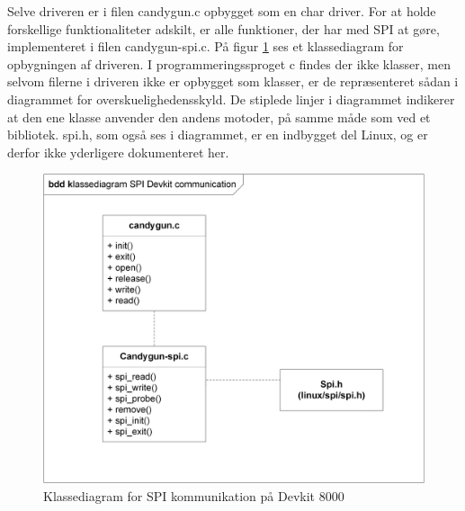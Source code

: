 
Selve driveren er i filen candygun.c opbygget som en char driver. For at holde forskellige funktionaliteter adskilt, er alle funktioner, der har med SPI at gøre, implementeret i filen candygun-spi.c.  På figur \ref{fig:spiklasse} ses et klassediagram for opbygningen af driveren. I programmeringssproget c findes der ikke klasser, men selvom filerne i driveren ikke er opbygget som klasser, er de repræsenteret sådan i diagrammet for overskuelighedensskyld. De stiplede linjer i diagrammet indikerer at den ene klasse anvender den andens motoder, på samme måde som ved et bibliotek. spi.h, som også ses i diagrammet, er en indbygget del Linux, og er derfor ikke yderligere dokumenteret her. 

\begin{figure}[H]
	\centering
	\includegraphics[width=\textwidth]{Afsnit/DesignOgImplementering/images/SPIklasse}
	\caption{Klassediagram for SPI kommunikation på Devkit 8000}
	\label{fig:spiklasse}
\end{figure}

